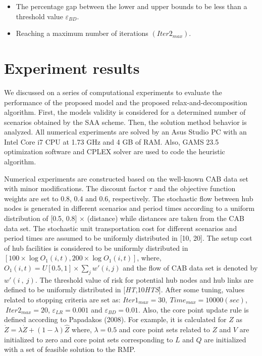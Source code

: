 \documentclass[review]{elsarticle}
\begin{document}
\begin{itemize}
\item  The percentage gap between the lower and upper bounds to be less than a threshold value ${\varepsilon }_{BD}$.

\item  Reaching a maximum number of iterations $\left({Iter2}_{max}\right)$.
\end{itemize}

\section{Experiment results}\label{se5}

We discussed on a series of computational experiments to evaluate the performance of the proposed model and the proposed relax-and-decomposition algorithm. First, the models validity is considered for a determined number of scenarios obtained by the SAA scheme. Then, the solution method behavior is analyzed. All numerical experiments are solved by an Asus Studio PC with an Intel Core i7 CPU at 1.73 GHz and 4 GB of RAM. Also, GAMS 23.5 optimization software and CPLEX solver are used to code the heuristic algorithm.

Numerical experiments are constructed based on the well-known CAB data set with minor modifications. The discount factor $\tau $ and the objective function weights are set to 0.8, 0.4 and 0.6, respectively. The stochastic flow between hub nodes is generated in different scenarios and period times according to a uniform distribution of [0.5, 0.8] $\times$ (distance) while distances are taken from the CAB data set. The stochastic unit transportation cost for different scenarios and period times are assumed to be uniformly distributed in [10, 20]. The setup cost of hub facilities is considered to be uniformly distributed in $[100\times \log  O_1 (i,t), 200\times\log  O_1\left(i,t\right)]$, where, $O_1\left(i,t\right)=U[0.5,1]\times\sum_j{w' \left(i, j\right)}$ and the flow of CAB data set is denoted by $w' \left(i\ ,\ j\right)$. The threshold value of risk for potential hub nodes and hub links are defined to be uniformly distributed in [\textbar \textit{H}\textbar \textbar \textit{T}\textbar ,10\textbar \textit{H}\textbar \textbar \textit{T}\textbar \textbar \textit{S}\textbar ]. After some tuning, values related to stopping criteria are set as: ${Iter1}_{max}=30,\ {Time}_{max}=10000(sec)$,$\ {Iter2}_{max}=20$, ${\varepsilon }_{LR}=0.001$ and ${\varepsilon }_{BD}=0.01$. Also, the core point update rule is defined according to Papadakos (2008). For example, it is calculated for $Z$ as $\dot{Z}=\lambda \dot{Z}+\left(1-\lambda \right)\hat{Z}$ where, $\lambda =0.5$ and core point sets related to $Z$ and $V$ are initialized to zero and core point sets corresponding to $L$ and $Q$ are initialized with a set of feasible solution to the RMP.
\end{document}
